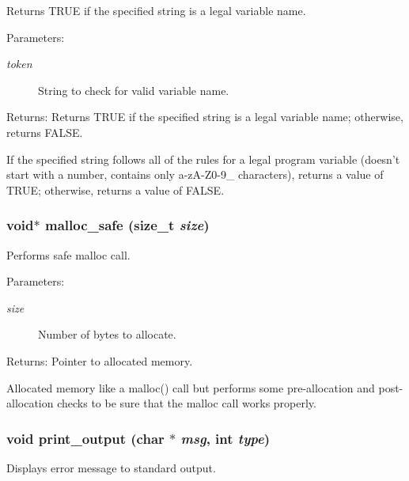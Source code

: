 Returns TRUE if the specified string is a legal variable name.

\begin{Desc}
\item[Parameters:]
\begin{description}
\item[{\em token}]String to check for valid variable name. \end{description}
\end{Desc}
\begin{Desc}
\item[Returns:]Returns TRUE if the specified string is a legal variable name; otherwise, returns FALSE.\end{Desc}
If the specified string follows all of the rules for a legal program variable (doesn't start with a number, contains only a-z\-A-Z0-9\_\- characters), returns a value of TRUE; otherwise, returns a value of FALSE. 
\subsubsection{\setlength{\rightskip}{0pt plus 5cm}void$\ast$ malloc\_\-safe (size\_\-t {\em size})}\label{util_8c_a20}


Performs safe malloc call.

\begin{Desc}
\item[Parameters:]
\begin{description}
\item[{\em size}]Number of bytes to allocate.\end{description}
\end{Desc}
\begin{Desc}
\item[Returns:]Pointer to allocated memory.\end{Desc}
Allocated memory like a malloc() call but performs some pre-allocation and post-allocation checks to be sure that the malloc call works properly. 
\subsubsection{\setlength{\rightskip}{0pt plus 5cm}void print\_\-output (char $\ast$ {\em msg}, int {\em type})}\label{util_8c_a7}


Displays error message to standard output.

